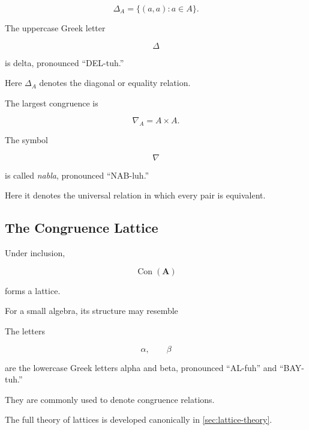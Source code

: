 \[ \Delta_A=\{(a,a):a\in A\}. \]

The uppercase Greek letter

\[ \Delta \]

is delta, pronounced ``DEL-tuh.''

Here \(\Delta_A\) denotes the diagonal or equality relation.

The largest congruence is

\[ \nabla_A=A\times A. \]

The symbol

\[ \nabla \]

is called \emph{nabla}, pronounced ``NAB-luh.''

Here it denotes the universal relation in which every pair is equivalent.

\subsection{The Congruence Lattice}
\label{subsec:congruence-lattice-structure}

Under inclusion,

\[ \operatorname{Con}(\mathbf A) \]

forms a lattice.

For a small algebra, its structure may resemble

\begin{center}
\end{center}

The letters

\[ \alpha,\qquad\beta \]

are the lowercase Greek letters alpha and beta, pronounced ``AL-fuh'' and
``BAY-tuh.''

They are commonly used to denote congruence relations.

The full theory of lattices is developed canonically in
\cref{sec:lattice-theory}.

